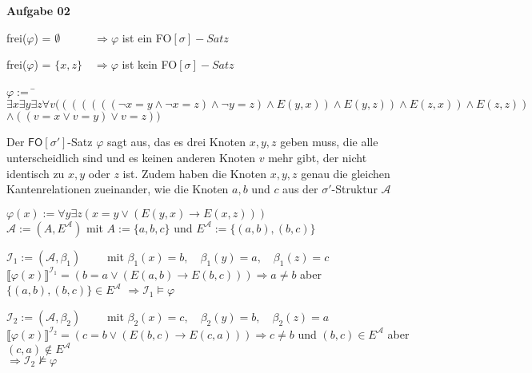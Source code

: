 \documentclass[a4paper,10pt]{article}
\begin{document}
	\textbf{Aufgabe 02}
	\begin{compactenum} [(a)]
		\item \begin{compactenum} [(i)]
			\item frei($\varphi$) = $ \emptyset \qquad \quad \Longrightarrow \varphi $ ist ein FO$[\sigma]-Satz $
			\item frei($\varphi$) = $ \{x,z\} \quad \Longrightarrow \varphi $ ist kein FO$[\sigma]-Satz $
		\end{compactenum} 
		\item \begin{tabbing}
			$ \varphi := $ \= $\exists x \exists y \exists z \forall v (((((((\lnot x = y \wedge \lnot x = z) \wedge \lnot y = z) \wedge E(y,x)) \wedge E(y,z)) \wedge E(z,x)) \wedge E(z,z)) $ \\
			\> $\wedge ((v=x \vee v=y )\vee v=z))$
		\end{tabbing}
		Der $\mathsf{FO}[\sigma']$-Satz $ \varphi $ sagt aus, das es drei Knoten $x,y,z$ geben muss, die alle unterscheidlich sind und es keinen anderen Knoten $v$ mehr gibt, der nicht identisch zu $x,y$ oder $z$ ist. Zudem haben die Knoten $x,y,z$ genau die gleichen Kantenrelationen zueinander, wie die Knoten $a,b$ und $c$ aus der $ \sigma'$-Struktur $ \mathcal{A} $ \ \\
		\item $ \varphi(x) := \forall y \exists z (x = y \vee (E(y,x) \rightarrow E(x,z))) $\\
		$ \mathcal{A} := (A, E^\mathcal{A})$ mit $A:= \{a,b,c\}$ und $ E^\mathcal{A} := \{(a,b),(b,c)\} $
		\begin{compactitem}
			\item $ \mathcal{I}_1 :=(\mathcal{A},\beta_1) \qquad $ mit $ \beta_1(x) = b, \quad \beta_1(y) = a, \quad \beta_1(z) = c $\\
			$\llbracket\varphi(x)\rrbracket^{\mathcal{I}_1} =(b=a \vee (E(a,b)\rightarrow E(b,c))) \Rightarrow a \neq b $ aber $ \{(a,b), (b,c)\} \in E^\mathcal{A}$
			$\Rightarrow \mathcal{I}_1 \models \varphi $
			\item $ \mathcal{I}_2 :=(\mathcal{A},\beta_2) \qquad $ mit $ \beta_2(x) = c, \quad \beta_2(y) = b, \quad \beta_2(z) = a $\\
			$\llbracket\varphi(x)\rrbracket^{\mathcal{I}_2} =(c=b \vee (E(b,c)\rightarrow E(c,a))) \Rightarrow c \neq b $ und $ (b,c) \in E^\mathcal{A} $ aber $ (c,a) \not\in E^\mathcal{A} $\\
			$ \Rightarrow \mathcal{I}_2 \not\models \varphi $
		\end{compactitem}
	\end{compactenum} \
	
\end{document}
